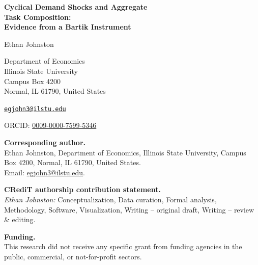 \documentclass[11pt]{article}
\begin{document}
\thispagestyle{empty}

\begin{center}
    {\LARGE\bfseries Cyclical Demand Shocks and Aggregate\\[3pt]
                    Task Composition:\\[6pt]
                    Evidence from a Bartik Instrument\par}

    \vspace{2em}

    {\large Ethan Johnston\par}

    \vspace{1em}

    Department of Economics\\
    Illinois State University\\
    Campus Box 4200\\
    Normal, IL 61790, United States

    \vspace{0.5em}

    \href{mailto:egjohn3@ilstu.edu}{\texttt{egjohn3@ilstu.edu}}

    \vspace{0.5em}

    ORCID: \href{https://orcid.org/0009-0000-7599-5346}{0009-0000-7599-5346}
\end{center}

\vspace{2em}

\noindent\textbf{Corresponding author.}\\
Ethan Johnston, Department of Economics, Illinois State University,
Campus Box 4200, Normal, IL 61790, United States.\\
Email: \href{mailto:egjohn3@ilstu.edu}{egjohn3@ilstu.edu}.

\vspace{1em}

\noindent\textbf{CRediT authorship contribution statement.}\\
\textit{Ethan Johnston:} Conceptualization, Data curation, Formal analysis,
Methodology, Software, Visualization, Writing -- original draft,
Writing -- review \& editing.

\vspace{1em}

\noindent\textbf{Funding.}\\
This research did not receive any specific grant from funding agencies
in the public, commercial, or not-for-profit sectors.
\end{document}
